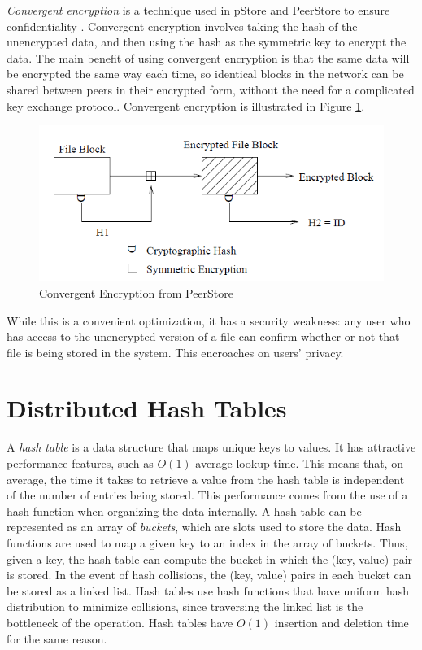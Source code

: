 \documentclass[12pt]{report}
\begin{document}
\textit{Convergent encryption} is a technique used in pStore and PeerStore to ensure confidentiality \cite{pStore, PeerStore}. Convergent encryption involves taking the hash of the unencrypted data, and then using the hash as the symmetric key to encrypt the data. The main benefit of using convergent encryption is that the same data will be encrypted the same way each time, so identical blocks in the network can be shared between peers in their encrypted form, without the need for a complicated key exchange protocol. Convergent encryption is illustrated in Figure \ref{fig:convergent}.

\begin{figure} \label{fig:convergent}
  \centering
  \includegraphics[scale=0.75]{figures/ConvergentEncryption}
  \caption{Convergent Encryption from PeerStore}
\end{figure}

While this is a convenient optimization, it has a security weakness: any user who has access to the unencrypted version of a file can confirm whether or not that file is being stored in the system. This encroaches on users' privacy.



\section{Distributed Hash Tables} \label{sec:backgroundDHT}

A \textit{hash table} is a data structure that maps unique keys to values. It has attractive performance features, such as $O(1)$ average lookup time. This means that, on average, the time it takes to retrieve a value from the hash table is independent of the number of entries being stored. This performance comes from the use of a hash function when organizing the data internally. A hash table can be represented as an array of \textit{buckets}, which are slots used to store the data. Hash functions are used to map a given key to an index in the array of buckets. Thus, given a key, the hash table can compute the bucket in which the (key, value) pair is stored. In the event of hash collisions, the (key, value) pairs in each bucket can be stored as a linked list. Hash tables use hash functions that have uniform hash distribution to minimize collisions, since traversing the linked list is the bottleneck of the operation. Hash tables have $O(1)$ insertion and deletion time for the same reason.
\end{document}
